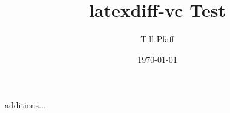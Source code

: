 \documentclass{scrartcl}
\begin{document}
\author{Till Pfaff}
\date{\today}
\title{latexdiff-vc Test}
\maketitle
\lipsum[1-2]
additions....
\lipsum[3-4]
\end{document}
